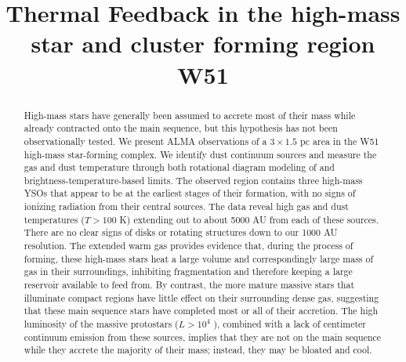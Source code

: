 \documentclass[twocolumn]{aastex61}
\begin{document}
\title{Thermal Feedback in the high-mass star and cluster forming region W51}




\begin{abstract}
    High-mass stars have generally been assumed to accrete most of their
    mass while already contracted onto the main sequence, but this
    hypothesis has not been observationally tested.
    We present ALMA observations of a $3\times1.5$ pc area in the W51
    high-mass star-forming complex.  We identify dust continuum sources and
    measure the gas and dust temperature through both rotational diagram
    modeling of \methanol and brightness-temperature-based limits.  The
    observed region contains three high-mass YSOs that appear to be at the
    earliest stages of their formation, with no signs of ionizing radiation
    from their central sources.
    The data reveal high gas and dust
    temperatures ($T > 100$ K) extending out to about 5000 AU from each of
    these sources.  There are no clear signs of disks or rotating
    structures down to our 1000 AU resolution.
    The extended warm gas provides evidence that, during the process of
    forming, these high-mass stars heat a large volume and correspondingly
    large mass of gas in their surroundings, inhibiting fragmentation and
    therefore keeping a large reservoir available to feed from.  By contrast,
    the more mature massive stars that illuminate compact \hii regions have
    little effect on their surrounding dense gas, suggesting that these main
    sequence stars have completed most or all of their accretion.  
    The high luminosity of the massive protostars ($L>10^4$ \lsun), combined
    with a lack of centimeter continuum emission from these sources, implies
    that they are not on the main sequence while they accrete the majority of
    their mass; instead, they may be bloated and cool.


    

\end{abstract}
\end{document}

